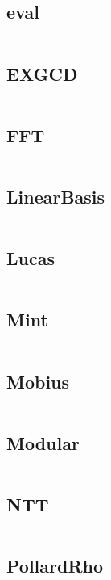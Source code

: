 \documentclass[a4]{article}
\begin{document}
\subsection{eval}
\inputminted[mathescape,linenos,numbersep=5pt,frame=lines,framesep=2mm]{cpp}{src/math/eval.cpp}
\subsection{EXGCD}
\inputminted[mathescape,linenos,numbersep=5pt,frame=lines,framesep=2mm]{cpp}{src/math/EXGCD.cpp}
\subsection{FFT}
\inputminted[mathescape,linenos,numbersep=5pt,frame=lines,framesep=2mm]{cpp}{src/math/FFT.cpp}
\subsection{LinearBasis}
\inputminted[mathescape,linenos,numbersep=5pt,frame=lines,framesep=2mm]{cpp}{src/math/LinearBasis.cpp}
\subsection{Lucas}
\inputminted[mathescape,linenos,numbersep=5pt,frame=lines,framesep=2mm]{cpp}{src/math/Lucas.cpp}
\subsection{Mint}
\inputminted[mathescape,linenos,numbersep=5pt,frame=lines,framesep=2mm]{cpp}{src/math/Mint.cpp}
\subsection{Mobius}
\inputminted[mathescape,linenos,numbersep=5pt,frame=lines,framesep=2mm]{cpp}{src/math/Mobius.cpp}
\subsection{Modular}
\inputminted[mathescape,linenos,numbersep=5pt,frame=lines,framesep=2mm]{cpp}{src/math/Modular.cpp}
\subsection{NTT}
\inputminted[mathescape,linenos,numbersep=5pt,frame=lines,framesep=2mm]{cpp}{src/math/NTT.cpp}
\subsection{PollardRho}
\inputminted[mathescape,linenos,numbersep=5pt,frame=lines,framesep=2mm]{cpp}{src/math/PollardRho.cpp}
\end{document}
